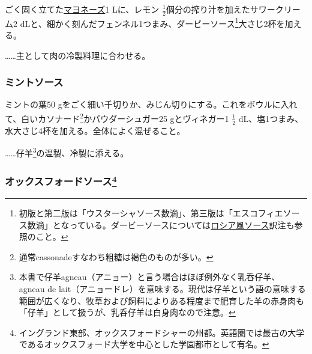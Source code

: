 \begin{recette}
ごく固く立てた\protect\hyperlink{mayonnaise}{マヨネーズ}1 Lに、レモン
\(\frac{1}{2}\)個分の搾り汁を加えたサワークリーム2
dLと、細かく刻んだフェンネル1つまみ、ダービーソース\footnote{初版と第二版は「ウスターシャソース数滴」、第三版は「エスコフィエソース数滴」となっている。ダービーソースについては\protect\hyperlink{sauce-russe-froide}{ロシア風ソース}訳注も参照のこと。}大さじ2杯を加える。

\ldots{}\ldots{}主として肉の冷製料理に合わせる。

\atoaki{}

\hypertarget{mint-sauce}{%
\subsubsection{ミントソース}\label{mint-sauce}}


 

ミントの葉50
gをごく細い千切りか、みじん切りにする。これをボウルに入れて、白いカソナード\footnote{通常cassonadeすなわち粗糖は褐色のものが多い。}かパウダーシュガー25
gとヴィネガー1 \(\frac{1}{2}\)
dL、塩1つまみ、水大さじ4杯を加える。全体によく混ぜること。

\ldots{}\ldots{}仔羊\footnote{本書で仔羊agneau（アニョー）と言う場合はほぼ例外なく乳呑仔羊、
  agneau de
  lait（アニョードレ）を意味する。現代は仔羊という語の意味する範囲が広くなり、牧草および飼料によりある程度まで肥育した羊の赤身肉も「仔羊」として扱うが、乳呑仔羊は白身肉なので注意。}の温製、冷製に添える。

\atoaki{}

\hypertarget{oxford-sauce}{%
\subsubsection[オックスフォードソース]{\texorpdfstring{オックスフォードソース\footnote{イングランド東部、オックスフォードシャーの州都。英語圏では最古の大学であるオックスフォード大学を中心とした学園都市として有名。}}{オックスフォードソース}}\label{oxford-sauce}}



\end{recette}
